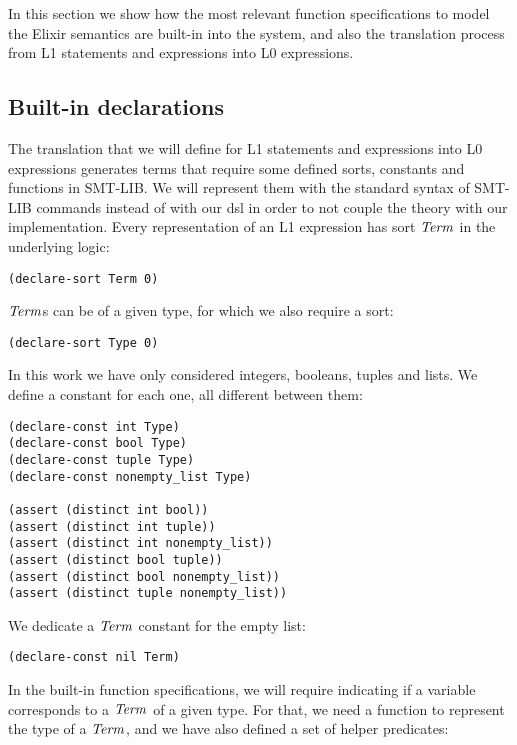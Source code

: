 In this section we show how the most relevant function specifications to model
the Elixir semantics are built-in into the system, and also the translation
process from L1 statements and expressions into L0 expressions. 

\subsection{Built-in declarations}

The translation that we will define for L1 statements and expressions into L0
expressions generates terms that require some defined sorts, constants and
functions in SMT-LIB. We will represent them with the standard syntax of SMT-LIB
commands instead of with our \gls{dsl} in order to not couple the theory with
our implementation. Every representation of an L1 expression has sort $\mathit{Term}$ in
the underlying logic:

\begin{verbatim}
(declare-sort Term 0)
\end{verbatim}

$\mathit{Term}$s can be of a given type, for which we also require a sort:

\begin{verbatim}
(declare-sort Type 0)
\end{verbatim}

In this work we have only considered integers, booleans, tuples and lists. We
define a constant for each one, all different between them:

\begin{verbatim}
(declare-const int Type)
(declare-const bool Type)
(declare-const tuple Type)
(declare-const nonempty_list Type)

(assert (distinct int bool))
(assert (distinct int tuple))
(assert (distinct int nonempty_list))
(assert (distinct bool tuple))
(assert (distinct bool nonempty_list))
(assert (distinct tuple nonempty_list))
\end{verbatim}

We dedicate a $\mathit{Term}$ constant for the empty list:

\begin{verbatim}
(declare-const nil Term)
\end{verbatim}

In the built-in function specifications, we will require indicating if a
variable corresponds to a $\mathit{Term}$ of a given type. For that, we need a function
to represent the type of a $\mathit{Term}$, and we have also defined a set of helper
predicates:

